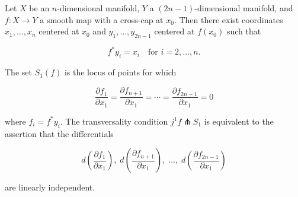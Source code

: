 Let $X$ be an $n$-dimensional manifold, $Y$ a $(2n-1)$-dimensional manifold, and $f: X \to Y$ a smooth map with a cross-cap at $x_0$. Then there exist coordinates $x_1, \ldots, x_n$ centered at $x_0$ and $y_1, \ldots, y_{2n-1}$ centered at $f(x_0)$ such that

$$
f^* y_i = x_i \quad \text{for } i = 2, \ldots, n.
$$

The set $S_1(f)$ is the locus of points for which

$$
\frac{\partial f_1}{\partial x_1} = \frac{\partial f_{n+1}}{\partial x_1} = \cdots = \frac{\partial f_{2n-1}}{\partial x_1} = 0
$$

where $f_i = f^* y_i$. The transversality condition $j^1 f \pitchfork S_1$ is equivalent to the assertion that the differentials

$$
d\!\left(\frac{\partial f_1}{\partial x_1}\right),\; d\!\left(\frac{\partial f_{n+1}}{\partial x_1}\right),\; \ldots,\; d\!\left(\frac{\partial f_{2n-1}}{\partial x_1}\right)
$$

are linearly independent.
